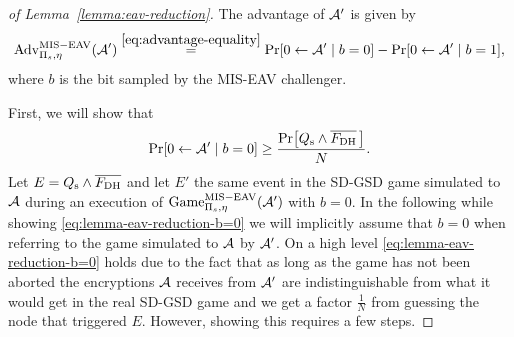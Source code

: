 \begin{proof}[of Lemma~\ref{lemma:eav-reduction}]
	The advantage of $\mathcal{A}'$ is given by
	\begin{equation} \label{eq:lemma-eav-reduction-advantage}
		\advantage{\Pi_s}{\eta}{MIS-EAV}(\adv') \stackrel{\eqref{eq:advantage-equality}}{=}  \pr{0 \from \adv' \mid b = 0} - \pr{0 \from \adv' \mid b = 1},
	\end{equation}
	where $b$ is the bit sampled by the MIS-EAV challenger.


	First, we will show that
	\begin{equation} \label{eq:lemma-eav-reduction-b=0}
		\pr{0 \from \adv' \mid b = 0} \ge \frac{\pr{\qs \land \overline{\fdh}\,}}{N}.
	\end{equation}
	Let $E = Q_\mathrm{s} \land \overline{F_\mathrm{DH}}$ and let $E'$ the same event in the SD-GSD game simulated to $\mathcal{A}$ during an execution of $\mathrm{Game}_{\Pi_s, \eta}^{\mathrm{MIS-EAV}}(\mathcal{A}')$ with $b = 0$. In the following while showing \eqref{eq:lemma-eav-reduction-b=0} we will implicitly assume that $b = 0$ when referring to the game simulated to $\mathcal{A}$ by $\mathcal{A}'$.
	On a high level \eqref{eq:lemma-eav-reduction-b=0} holds due to the fact that as long as the game has not been aborted the encryptions $\mathcal{A}$ receives from $\mathcal{A}'$ are indistinguishable from what it would get in the real SD-GSD game and we get a factor $\frac{1}{N}$ from guessing the node that triggered $E$. However, showing this requires a few steps.


\end{proof}
